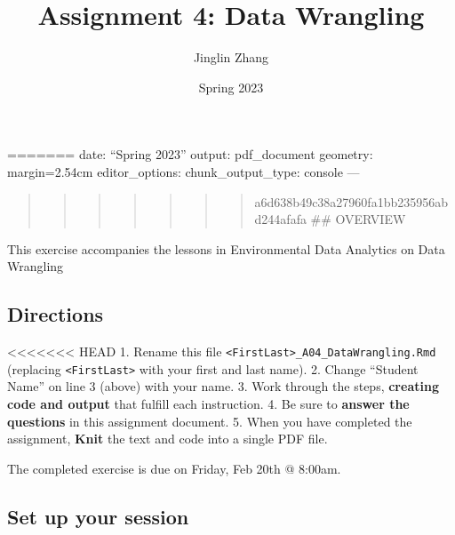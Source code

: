 \documentclass[
]{article}
\title{Assignment 4: Data Wrangling}
\author{Jinglin Zhang}
\date{Spring 2023}
\begin{document}
\maketitle

======= date: ``Spring 2023'' output: pdf\_document geometry:
margin=2.54cm editor\_options: chunk\_output\_type: console ---

\begin{quote}
\begin{quote}
\begin{quote}
\begin{quote}
\begin{quote}
\begin{quote}
\begin{quote}
a6d638b49c38a27960fa1bb235956abd244afafa \#\# OVERVIEW
\end{quote}
\end{quote}
\end{quote}
\end{quote}
\end{quote}
\end{quote}
\end{quote}

This exercise accompanies the lessons in Environmental Data Analytics on
Data Wrangling

\hypertarget{directions}{%
\subsection{Directions}\label{directions}}

\textless\textless\textless\textless\textless\textless\textless{} HEAD
1. Rename this file
\texttt{\textless{}FirstLast\textgreater{}\_A04\_DataWrangling.Rmd}
(replacing \texttt{\textless{}FirstLast\textgreater{}} with your first
and last name). 2. Change ``Student Name'' on line 3 (above) with your
name. 3. Work through the steps, \textbf{creating code and output} that
fulfill each instruction. 4. Be sure to \textbf{answer the questions} in
this assignment document. 5. When you have completed the assignment,
\textbf{Knit} the text and code into a single PDF file.

The completed exercise is due on Friday, Feb 20th @ 8:00am.

\hypertarget{set-up-your-session}{%
\subsection{Set up your session}\label{set-up-your-session}}
\end{document}
